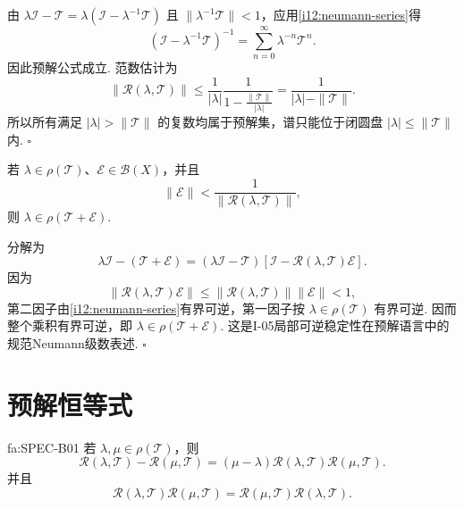 \begin{FAProof}
由
\(\displaystyle \lambda\mathcal I-\mathcal T = \lambda\left(\mathcal I-\lambda^{-1}\mathcal T\right)\)
且 \(\displaystyle \|\lambda^{-1}\mathcal T\|<1\)，应用\autoref{i12:neumann-series}得
\[
(\mathcal I-\lambda^{-1}\mathcal T)^{-1}
=
\sum_{n=0}^{\infty}\lambda^{-n}\mathcal T^n.
\]
因此预解公式成立. 范数估计为
\[
\|\mathcal R(\lambda,\mathcal T)\|
\leqslant
\frac{1}{|\lambda|}
\frac{1}{1-\frac{\|\mathcal T\|}{|\lambda|}}
=
\frac{1}{|\lambda|-\|\mathcal T\|}.
\]
所以所有满足 \(\displaystyle |\lambda|>\|\mathcal T\|\) 的复数均属于预解集，谱只能位于闭圆盘 \(\displaystyle |\lambda|\leqslant\|\mathcal T\|\) 内.
\hfill\(\square\)
\end{FAProof}

\begin{FAApplication}[预解形式的扰动可逆性]\label{i12:perturbative-invertibility}
若 \(\displaystyle \lambda\in\rho(\mathcal T)\)、\(\displaystyle \mathcal E\in\mathcal B(X)\)，并且
\[
\|\mathcal E\|
<
\frac{1}{\|\mathcal R(\lambda,\mathcal T)\|},
\]
则 \(\displaystyle \lambda\in\rho(\mathcal T+\mathcal E)\).
\end{FAApplication}

\begin{FAProof}
分解为
\[
\lambda\mathcal I-(\mathcal T+\mathcal E)
=
(\lambda\mathcal I-\mathcal T)
\left[
\mathcal I-\mathcal R(\lambda,\mathcal T)\mathcal E
\right].
\]
因为
\[
\|\mathcal R(\lambda,\mathcal T)\mathcal E\|
\leqslant
\|\mathcal R(\lambda,\mathcal T)\|\|\mathcal E\|
<1,
\]
第二因子由\autoref{i12:neumann-series}有界可逆，第一因子按 \(\displaystyle \lambda\in\rho(\mathcal T)\) 有界可逆. 因而整个乘积有界可逆，即 \(\displaystyle \lambda\in\rho(\mathcal T+\mathcal E)\). 这是I-05局部可逆稳定性在预解语言中的规范Neumann级数表述.
\hfill\(\square\)
\end{FAProof}

\section{预解恒等式}\label{sec:i12-resolvent-identity}

\begin{FATheorem}[B][预解恒等式]{fa:SPEC-B01}
若 \(\displaystyle \lambda,\mu\in\rho(\mathcal T)\)，则
\[
\mathcal R(\lambda,\mathcal T)
-
\mathcal R(\mu,\mathcal T)
=
(\mu-\lambda)
\mathcal R(\lambda,\mathcal T)
\mathcal R(\mu,\mathcal T).
\]
并且
\[
\mathcal R(\lambda,\mathcal T)
\mathcal R(\mu,\mathcal T)
=
\mathcal R(\mu,\mathcal T)
\mathcal R(\lambda,\mathcal T).
\]
\end{FATheorem}

